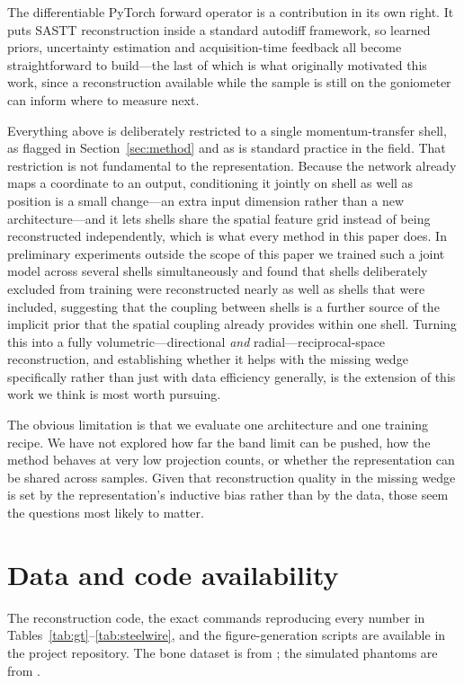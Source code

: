 \documentclass[11pt,a4paper]{article}
\begin{document}
The differentiable PyTorch forward operator is a contribution in its own right. It puts
SASTT reconstruction inside a standard autodiff framework, so learned priors, uncertainty
estimation and acquisition-time feedback all become straightforward to build---the last of
which is what originally motivated this work, since a reconstruction available while the
sample is still on the goniometer can inform where to measure next.

Everything above is deliberately restricted to a single momentum-transfer shell, as flagged
in Section~\ref{sec:method} and as is standard practice in the field. That restriction is
not fundamental to the representation. Because the network already maps a coordinate to an
output, conditioning it jointly on shell as well as position is a small change---an extra
input dimension rather than a new architecture---and it lets shells share the spatial
feature grid instead of being reconstructed independently, which is what every method in
this paper does. In preliminary experiments outside the scope of this paper we trained such
a joint model across several shells simultaneously and found that shells deliberately
excluded from training were reconstructed nearly as well as shells that were included,
suggesting that the coupling between shells is a further source of the implicit prior that
the spatial coupling already provides within one shell. Turning this into a fully
volumetric---directional \emph{and} radial---reciprocal-space reconstruction, and
establishing whether it helps with the missing wedge specifically rather than just with
data efficiency generally, is the extension of this work we think is most worth pursuing.

The obvious limitation is that we evaluate one architecture and one training recipe. We
have not explored how far the band limit can be pushed, how the method behaves at very
low projection counts, or whether the representation can be shared across samples. Given
that reconstruction quality in the missing wedge is set by the representation's inductive
bias rather than by the data, those seem the questions most likely to matter.

\section*{Data and code availability}

The reconstruction code, the exact commands reproducing every number in
Tables~\ref{tab:gt}--\ref{tab:steelwire}, and the figure-generation scripts are available
in the project repository. The bone dataset is from \citet{Nielsen2024}; the simulated
phantoms are from \citet{Nielsen2023}.
\end{document}

